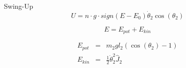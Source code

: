 \begin{equation}
\end{equation}

\begin{equation}
\end{equation}

Swing-Up
\begin{equation}
U = n \cdot g \cdot sign(E-E_0)\dot{\theta}_2\cos(\theta_2)
\end{equation}

\begin{equation}
E = E_{pot}+E_{kin}
\end{equation}

\begin{eqnarray}
E_{pot} &=& m_2gl_2(\cos(\theta_2)-1) \nonumber \\
E_{kin} &=& \frac{1}{2}\dot{\theta}^2_2\hat{J}_2
\end{eqnarray}

\begin{equation}
\end{equation}

